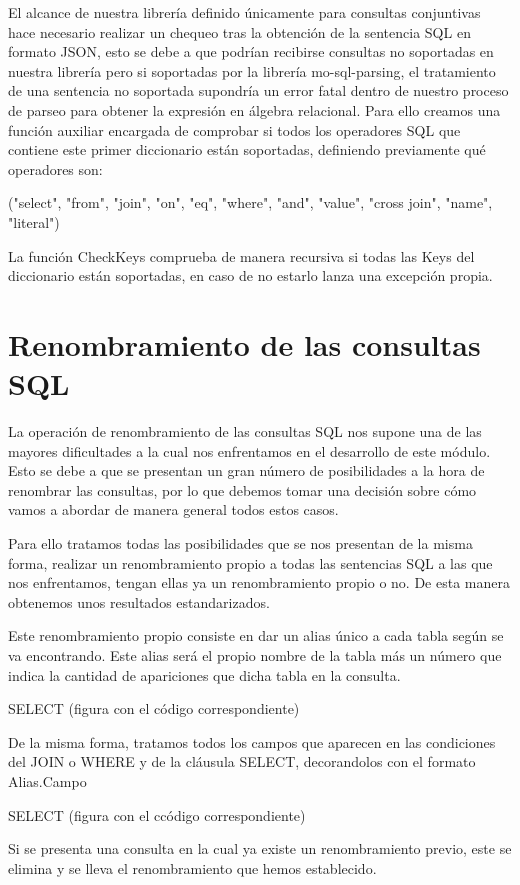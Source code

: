 El alcance de nuestra librería definido únicamente para consultas conjuntivas hace necesario realizar un chequeo tras la obtención de la sentencia SQL en formato JSON, esto se debe a que podrían recibirse consultas no soportadas en nuestra librería pero si soportadas por la librería mo-sql-parsing, el tratamiento de una sentencia no soportada supondría un error fatal dentro de nuestro proceso de parseo para obtener la expresión en álgebra relacional. Para ello creamos una función auxiliar encargada de comprobar si todos los operadores SQL que contiene este primer diccionario están soportadas, definiendo previamente qué operadores son:

("select", "from", "join", "on", "eq", "where", "and", "value", "cross join", "name", "literal")

La función CheckKeys comprueba de manera recursiva si todas las Keys del diccionario están soportadas, en caso de no estarlo lanza una excepción propia.


\section{Renombramiento de las consultas SQL}
La operación de renombramiento de las consultas SQL nos supone una de las mayores dificultades a la cual nos enfrentamos en el desarrollo de este módulo. Esto se debe a que se presentan un gran número de posibilidades a la hora de renombrar las consultas, por lo que debemos tomar una decisión sobre cómo vamos a abordar de manera general todos estos casos.

Para ello tratamos todas las posibilidades que se nos presentan de la misma forma, realizar un renombramiento propio a todas las sentencias SQL a las que nos enfrentamos, tengan ellas ya un renombramiento propio o no. De esta manera obtenemos unos resultados estandarizados.

Este renombramiento propio consiste en dar un alias único a cada tabla según se va encontrando. Este alias será el propio nombre de la tabla más un número que indica la cantidad de apariciones que dicha tabla en la consulta.

SELECT (figura con el código correspondiente)

De la misma forma, tratamos todos los campos que aparecen en las condiciones del JOIN o WHERE y de la cláusula SELECT, decorandolos con el formato Alias.Campo

SELECT (figura con el ccódigo correspondiente)

Si se presenta una consulta en la cual ya existe un renombramiento previo, este se elimina y se lleva el renombramiento que hemos establecido.

